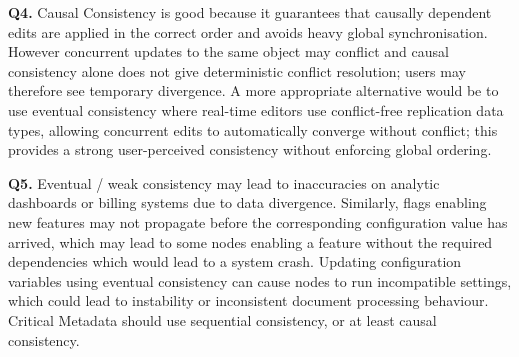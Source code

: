 \textbf{Q4.} Causal Consistency is good because it guarantees that causally dependent edits are applied in the correct order and avoids heavy global synchronisation. However concurrent updates to the same object may conflict and causal consistency alone does not give deterministic conflict resolution; users may therefore see temporary divergence. A more appropriate alternative would be to use eventual consistency where real-time editors use conflict-free replication data types, allowing concurrent edits to automatically converge without conflict; this provides a strong user-perceived consistency without enforcing global ordering.

\textbf{Q5.} Eventual / weak consistency may lead to inaccuracies on analytic dashboards or billing systems due to data divergence. Similarly, flags enabling new features may not propagate before the corresponding configuration value has arrived, which may lead to some nodes enabling a feature without the required dependencies which would lead to a system crash. Updating configuration variables using eventual consistency can cause nodes to run incompatible settings, which could lead to instability or inconsistent document processing behaviour. Critical Metadata should use sequential consistency, or at least causal consistency.